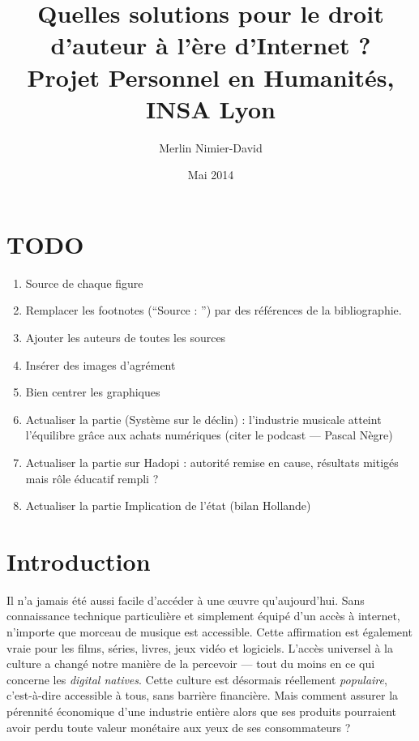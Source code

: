 \documentclass[a4paper]{report}
\title{
	Quelles solutions pour le droit d'auteur à l'ère d'Internet ?\\
	Projet Personnel en Humanités, INSA Lyon
}
\author{Merlin Nimier-David}
\date{Mai 2014}
\begin{document}
	\maketitle

	\tableofcontents

	\chapter{TODO}
	\begin{enumerate}
		\item Source de chaque figure
		\item Remplacer les footnotes (``Source : '') par des références de la bibliographie.
		\item Ajouter les auteurs de toutes les sources
		\item Insérer des images d'agrément
		\item Bien centrer les graphiques
		\item Actualiser la partie (Système sur le déclin) : l'industrie musicale atteint l'équilibre grâce aux achats numériques (citer le podcast — Pascal Nègre)
		\item Actualiser la partie sur Hadopi : autorité remise en cause, résultats mitigés mais rôle éducatif rempli ?
		\item Actualiser la partie Implication de l'état (bilan Hollande)
	\end{enumerate}


	\chapter{Introduction}
	Il n'a jamais été aussi facile d'accéder à une œuvre qu'aujourd'hui. Sans connaissance technique particulière et simplement équipé d'un accès à internet, n'importe que morceau de musique est accessible. Cette affirmation est également vraie pour les films, séries, livres, jeux vidéo et logiciels. L'accès universel à la culture a changé notre manière de la percevoir — tout du moins en ce qui concerne les \emph{digital natives}. Cette culture est désormais réellement \emph{populaire}, c'est-à-dire accessible à tous, sans barrière financière. Mais comment assurer la pérennité économique d'une industrie entière alors que ses produits pourraient avoir perdu toute valeur monétaire aux yeux de ses consommateurs ?
\end{document}
